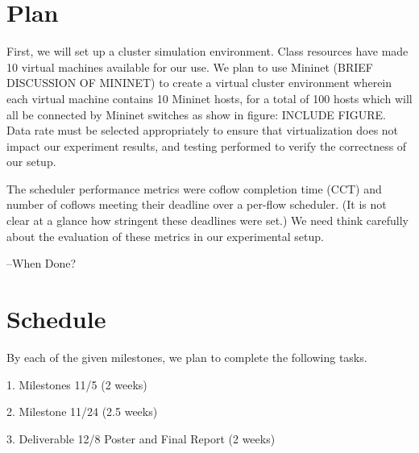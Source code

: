 \documentclass{article}
\begin{document}
\section{Plan}

First, we will set up a cluster simulation environment. Class resources have made 10 virtual machines available for our use. We plan to use Mininet \cite{website:mininet} (BRIEF DISCUSSION OF MININET) to create a virtual cluster environment wherein each virtual machine contains 10 Mininet hosts, for a total of 100 hosts which will all be connected by Mininet switches as show in figure: INCLUDE FIGURE. Data rate must be selected appropriately to ensure that virtualization does not impact our experiment results, and testing performed to verify the correctness of our setup.

The scheduler performance metrics were coflow completion time (CCT) and number of coflows meeting their deadline over a per-flow scheduler. (It is not clear at a glance how stringent these deadlines were set.) We need think carefully about the evaluation of these metrics in our experimental setup.

--When Done?

\section{Schedule}

By each of the given milestones, we plan to complete the following tasks.

1. Milestones 11/5 (2 weeks)

2. Milestone 11/24 (2.5 weeks)

3. Deliverable 12/8 Poster and Final Report (2 weeks)

%
%



\end{document}
